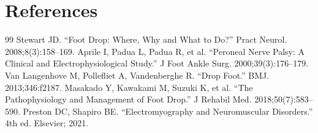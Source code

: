 \section*{References}
\begin{thebibliography}{99}
 Stewart JD. ``Foot Drop: Where, Why and What to Do?'' Pract Neurol. 2008;8(3):158--169.
 Aprile I, Padua L, Padua R, et al. ``Peroneal Nerve Palsy: A Clinical and Electrophysiological Study.'' J Foot Ankle Surg. 2000;39(3):176--179.
 Van Langenhove M, Pollefliet A, Vandenberghe R. ``Drop Foot.'' BMJ. 2013;346:f2187.
 Masakado Y, Kawakami M, Suzuki K, et al. ``The Pathophysiology and Management of Foot Drop.'' J Rehabil Med. 2018;50(7):583--590.
 Preston DC, Shapiro BE. ``Electromyography and Neuromuscular Disorders.'' 4th ed. Elsevier; 2021.
\end{thebibliography}
